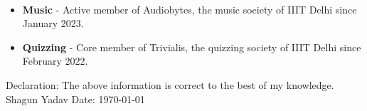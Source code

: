 \documentclass[10pt]{extarticle}
\newcommand{\yourname}{Shagun Yadav}%
\begin{document}
\begin{contained}\\
\vspace{5pt}
\begin{itemize}
    \setlength\itemsep{5pt}
    \item \textbf{Music} - Active member of Audiobytes, the music society of IIIT Delhi since January 2023.
    \item \textbf{Quizzing} - Core member of Trivialis, the quizzing society of IIIT Delhi since February 2022.
\end{itemize}
\vspace{5pt}
\end{contained}
Declaration: The above information is correct to the best of my knowledge.\newline
\yourname\newline
Date: \today
\end{document}
